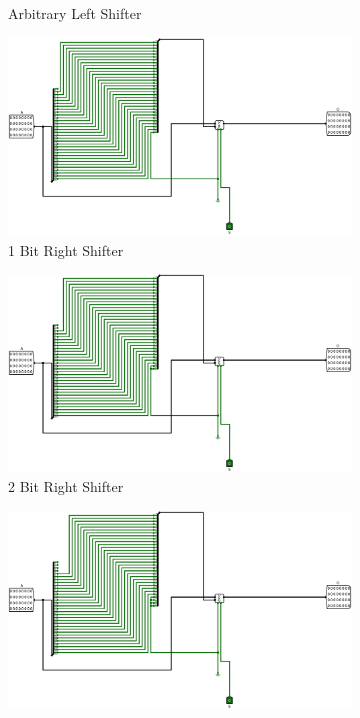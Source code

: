 \documentclass[12pt]{article}
\begin{document}
\begin{figure}[H]
\begin{subfigure}[b]{0.3\textwidth}
        \caption{Arbitrary Left Shifter}
        \label{fig:arbleftshift}
    \end{subfigure}
    \newline
    \newline
    \begin{subfigure}[b]{0.3\textwidth}
        \includegraphics[width=\textwidth]{Images/1RightShift.png}
        \caption{1 Bit Right Shifter}
        \label{fig:1rightshift}
    \end{subfigure}
    \hfill
    \begin{subfigure}[b]{0.3\textwidth}
        \includegraphics[width=\textwidth]{Images/2RightShift.png}
        \caption{2 Bit Right Shifter}
        \label{fig:2rightshift}
    \end{subfigure}
    \hfill
    \begin{subfigure}[b]{0.3\textwidth}
        \includegraphics[width=\textwidth]{Images/4RightShift.png}

\end{subfigure}
\end{figure}
\end{document}
